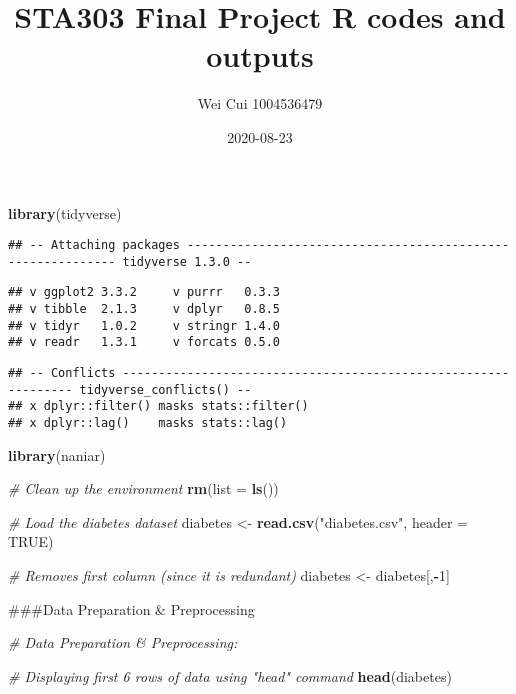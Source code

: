 \documentclass[
]{article}
\title{STA303 Final Project R codes and outputs}
\author{Wei Cui 1004536479}
\date{2020-08-23}
\newenvironment{Shaded}{\begin{snugshade}}{\end{snugshade}}
\newcommand{\CommentTok}[1]{\textcolor[rgb]{0.56,0.35,0.01}{\textit{#1}}}
\newcommand{\DataTypeTok}[1]{\textcolor[rgb]{0.13,0.29,0.53}{#1}}
\newcommand{\DecValTok}[1]{\textcolor[rgb]{0.00,0.00,0.81}{#1}}
\newcommand{\KeywordTok}[1]{\textcolor[rgb]{0.13,0.29,0.53}{\textbf{#1}}}
\newcommand{\NormalTok}[1]{#1}
\newcommand{\OperatorTok}[1]{\textcolor[rgb]{0.81,0.36,0.00}{\textbf{#1}}}
\newcommand{\OtherTok}[1]{\textcolor[rgb]{0.56,0.35,0.01}{#1}}
\newcommand{\StringTok}[1]{\textcolor[rgb]{0.31,0.60,0.02}{#1}}
\begin{document}
\maketitle

\begin{Shaded}
\begin{Highlighting}[]
\KeywordTok{library}\NormalTok{(tidyverse)}
\end{Highlighting}
\end{Shaded}

\begin{verbatim}
## -- Attaching packages ------------------------------------------------------------ tidyverse 1.3.0 --
\end{verbatim}

\begin{verbatim}
## v ggplot2 3.3.2     v purrr   0.3.3
## v tibble  2.1.3     v dplyr   0.8.5
## v tidyr   1.0.2     v stringr 1.4.0
## v readr   1.3.1     v forcats 0.5.0
\end{verbatim}

\begin{verbatim}
## -- Conflicts --------------------------------------------------------------- tidyverse_conflicts() --
## x dplyr::filter() masks stats::filter()
## x dplyr::lag()    masks stats::lag()
\end{verbatim}

\begin{Shaded}
\begin{Highlighting}[]
\KeywordTok{library}\NormalTok{(naniar)}

\CommentTok{# Clean up the environment}
\KeywordTok{rm}\NormalTok{(}\DataTypeTok{list =} \KeywordTok{ls}\NormalTok{())}

\CommentTok{# Load the diabetes dataset}
\NormalTok{diabetes <-}\StringTok{ }\KeywordTok{read.csv}\NormalTok{(}\StringTok{"diabetes.csv"}\NormalTok{, }\DataTypeTok{header =} \OtherTok{TRUE}\NormalTok{)}

\CommentTok{# Removes first column (since it is redundant)}
\NormalTok{diabetes <-}\StringTok{ }\NormalTok{diabetes[,}\OperatorTok{-}\DecValTok{1}\NormalTok{]}
\end{Highlighting}
\end{Shaded}

\#\#\#Data Preparation \& Preprocessing

\begin{Shaded}
\begin{Highlighting}[]
\CommentTok{# Data Preparation & Preprocessing:}

\CommentTok{# Displaying first 6 rows of data using "head" command}
\KeywordTok{head}\NormalTok{(diabetes)}
\end{Highlighting}
\end{Shaded}
\end{document}
